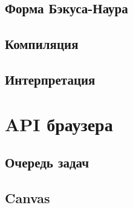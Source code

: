 \subsection{Форма Бэкуса-Наура}
\subsection{Компиляция}
\subsection{Интерпретация}
\section{API браузера}
\subsection{Очередь задач}
\subsection{Canvas}

